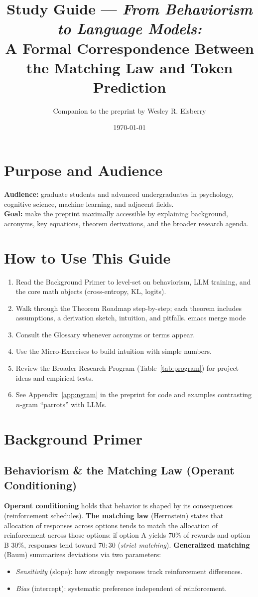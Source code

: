\documentclass[11pt]{article}
\title{Study Guide --- \emph{From Behaviorism to Language Models:}\\
A Formal Correspondence Between the Matching Law and Token Prediction}
\author{Companion to the preprint by Wesley R. Elsberry}
\date{\today}
\begin{document}
\maketitle

\section*{Purpose and Audience}
\textbf{Audience:} graduate students and advanced undergraduates in psychology, cognitive science, machine learning, and adjacent fields.\\
\textbf{Goal:} make the preprint maximally accessible by explaining background, acronyms, key equations, theorem derivations, and the broader research agenda.

\section{How to Use This Guide}
\begin{enumerate}[leftmargin=*]
  \item Read the Background Primer to level-set on behaviorism, LLM training, and the core math objects (cross-entropy, KL, logits).
  \item Walk through the Theorem Roadmap step-by-step; each theorem includes assumptions, a derivation sketch, intuition, and pitfalls.
emacs merge mode  \item Consult the Glossary whenever acronyms or terms appear.
  \item Use the Micro-Exercises to build intuition with simple numbers.
  \item Review the Broader Research Program (Table~\ref{tab:program}) for project ideas and empirical tests.
  \item See Appendix~\ref{app:ngram} in the preprint for code and examples contrasting $n$-gram “parrots” with LLMs.
\end{enumerate}

\section{Background Primer}

\subsection{Behaviorism \& the Matching Law (Operant Conditioning)}
\textbf{Operant conditioning} holds that behavior is shaped by its consequences (reinforcement schedules). \textbf{The matching law} (Herrnstein) states that allocation of responses across options tends to match the allocation of reinforcement across those options: if option A yields $70\%$ of rewards and option B $30\%$, responses tend toward $70{:}30$ (\emph{strict matching}). \textbf{Generalized matching} (Baum) summarizes deviations via two parameters:
\begin{itemize}[leftmargin=*]
  \item \emph{Sensitivity} (slope): how strongly responses track reinforcement differences.
  \item \emph{Bias} (intercept): systematic preference independent of reinforcement.
\end{itemize}
\end{document}
